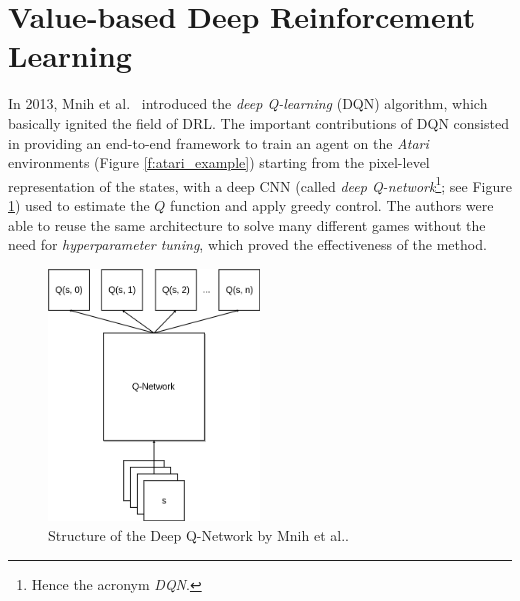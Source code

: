 \section{Value-based Deep Reinforcement Learning} \label{SOA:value}
In 2013, Mnih et al.\ \cite{mnih2015human} introduced the \textit{deep 
Q-learning} (DQN) algorithm, which basically ignited the field of DRL.
The important contributions of DQN consisted in providing an end-to-end 
framework to train an agent on the \textit{Atari} environments (Figure \ref{f:atari_example})
starting from the pixel-level representation of the states, with a deep CNN 
(called \textit{deep Q-network}\footnote{Hence the acronym \textit{DQN}.}; see 
Figure \ref{f:dqn_mnih}) used to estimate the $Q$ function and apply greedy 
control. 
The authors were able to reuse the same architecture to solve many different 
games without the need for \textit{hyperparameter tuning}, which proved the 
effectiveness of the method.
%
\begin{figure}[h]
    \includegraphics[width=0.5\textwidth]{pictures/dqn}
    \centering
    \caption[Structure of the Deep Q-Network by Mnih et al.\ ]{Structure of the 
	    Deep Q-Network by Mnih et al..}
    \label{f:dqn_mnih}
\end{figure}
%


